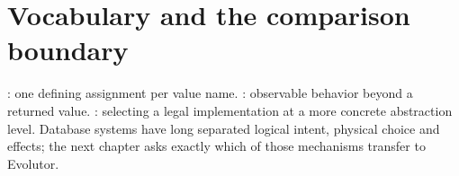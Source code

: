 \section{Vocabulary and the comparison boundary}
: one defining assignment per value name. : observable
behavior beyond a returned value. : selecting a legal
implementation at a more concrete abstraction level. Database systems have
long separated logical intent, physical choice and effects; the next chapter
asks exactly which of those mechanisms transfer to Evolutor.
